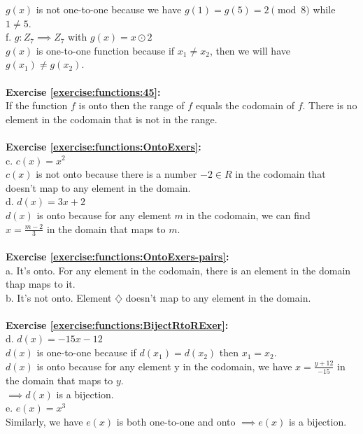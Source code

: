 $g(x)$ is not one-to-one because we have $g(1)=g(5)=2 \pmod{8}$ while $1\neq 5$.\\
f. $g: Z_7 \implies Z_7$ with $g(x)=x\odot 2$\\
$g(x)$ is one-to-one function because if $x_1\neq x_2$, then we will have $g(x_1)\neq g(x_2)$.\\
\\
\textbf{Exercise \ref{exercise:functions:45}:}\\
If the function $f$ is onto then the range of $f$ equals the codomain of $f$. There is no element in the codomain that is not in the range.\\
\\
\textbf{Exercise \ref{exercise:functions:OntoExers}:}\\
c. $c(x)=x^2$\\
$c(x)$ is not onto because there is a number $-2 \in R$ in the codomain that doesn't map to any element in the domain.\\
d. $d(x)=3x+2$\\
$d(x)$ is onto because for any element $m$ in the codomain, we can find\\ $x=\displaystyle\frac{m-2}{3}$ in the domain that maps to $m$.\\
\\
\textbf{Exercise \ref{exercise:functions:OntoExers-pairs}:}\\
a. It's onto. For any element in the codomain, there is an element in the domain thap maps to it.\\
b. It's not onto. Element $\diamondsuit$ doesn't map to any element in the domain.\\
\\
\textbf{Exercise \ref{exercise:functions:BijectRtoRExer}:}\\
d. $d(x)=-15x-12$\\
$d(x)$ is one-to-one because if $d(x_1)=d(x_2)$ then $x_1=x_2$.\\
$d(x)$ is onto because for any element y in the codomain, we have $x=\displaystyle\frac{y+12}{-15}$ in the domain that maps to $y$.\\
$\implies d(x)$ is a bijection.\\
e. $e(x)=x^3$\\
Similarly, we have $e(x)$ is both one-to-one and onto $\implies e(x)$ is a bijection.\\
\\
